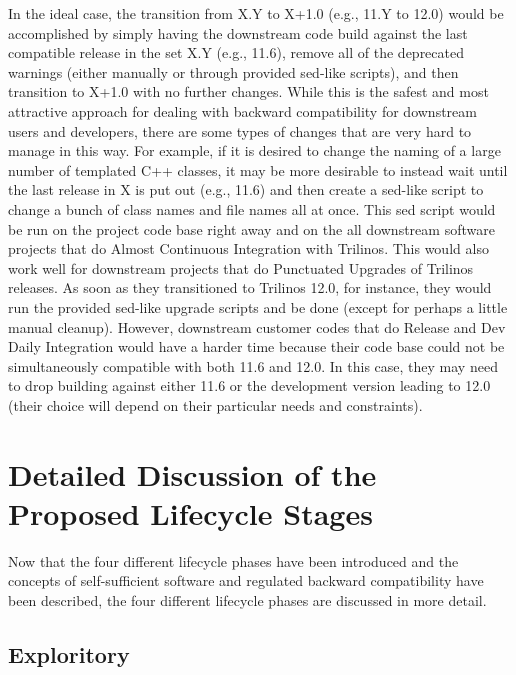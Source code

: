 \documentclass[11pt]{SANDreport}
\begin{document}
In the ideal case, the transition from X.Y to X+1.0 (e.g., 11.Y to
12.0) would be accomplished by simply having the downstream code build
against the last compatible release in the set X.Y (e.g., 11.6),
remove all of the deprecated warnings (either manually or through
provided sed-like scripts), and then transition to X+1.0 with no
further changes.  While this is the safest and most attractive
approach for dealing with backward compatibility for downstream users
and developers, there are some types of changes that are very hard to
manage in this way.  For example, if it is desired to change the
naming of a large number of templated C++ classes, it may be more
desirable to instead wait until the last release in X is put out
(e.g., 11.6) and then create a sed-like script to change a bunch of
class names and file names all at once.  This sed script would be run
on the project code base right away and on the all downstream software
projects that do Almost Continuous Integration
{}\cite{SoftwareIntegrationforCSE09} with Trilinos.  This would also
work well for downstream projects that do Punctuated Upgrades
{}\cite{SoftwareIntegrationforCSE09} of Trilinos releases.  As soon as
they transitioned to Trilinos 12.0, for instance, they would run the
provided sed-like upgrade scripts and be done (except for perhaps a
little manual cleanup).  However, downstream customer codes that do
Release and Dev Daily Integration {}\cite{SoftwareIntegrationforCSE09}
would have a harder time because their code base could not be
simultaneously compatible with both 11.6 and 12.0.  In this case, they
may need to drop building against either 11.6 or the development
version leading to 12.0 (their choice will depend on their particular
needs and constraints).


%
{}\section{Detailed Discussion of the Proposed Lifecycle Stages}
\label{sec:detained_lifecycle_stages}
%

Now that the four different lifecycle phases have been introduced and
the concepts of self-sufficient software and regulated backward
compatibility have been described, the four different lifecycle phases
are discussed in more detail.


%
{}\subsection{Exploritory}
\label{sec:exploratory_code}
%
\end{document}
